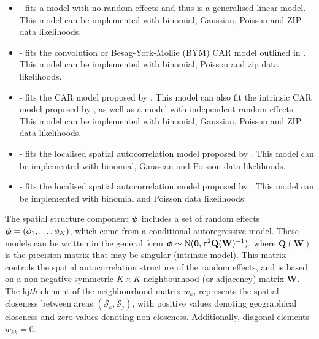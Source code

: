 \documentclass[article,shortnames,nojss]{jss}
\newcommand{\bd}[1]{\ensuremath{\mbox{\boldmath $#1$}}}
\begin{document}
\begin{itemize}
\item {} - fits a model with no random effects and thus is a generalised linear model. This model can be implemented with binomial, Gaussian, Poisson and ZIP data likelihoods.

\item {} - fits the convolution or Besag-York-Mollie (BYM) CAR model outlined in \cite{besag1991}. This model can be implemented with binomial, Poisson and zip data likelihoods.

\item {} - fits the CAR model proposed by \cite{leroux2000}. This model can also fit the intrinsic CAR model proposed by \cite{besag1991}, as well as a model with independent random effects. This model can be implemented with binomial, Gaussian, Poisson and ZIP data likelihoods.

\item {} - fits the localised spatial autocorrelation model proposed by \cite{lee2012}. This model can be implemented with binomial, Gaussian and Poisson data likelihoods.

\item {} - fits the localised spatial autocorrelation model proposed by \cite{lee2015}. This model can be implemented with binomial and Poisson data likelihoods.
\end{itemize}


The spatial structure component $\bd{\psi}$ includes a set of random effects $\bd{\phi}=(\phi_{1},\ldots,\phi_{K})$, which come from a conditional autoregressive model. These models can be written in the general form $\bd{\phi}\sim\mbox{N}(\mathbf{0},\tau^{2}\mathbf{Q}(\mathbf{W})^{-1})$, where $\mathbf{Q}(\mathbf{W})$ is the precision matrix that may be singular (intrinsic model). This matrix controls the spatial autocorrelation structure of the random effects, and is based on a non-negative symmetric $K\times K$ neighbourhood (or adjacency) matrix $\mathbf{W}$. The kj$th$ element of the neighbourhood matrix $w_{kj}$ represents the spatial closeness between areas $(\mathcal{S}_k, \mathcal{S}_j)$, with positive values denoting geographical closeness and zero values denoting non-closeness. Additionally, diagonal elements $w_{kk}=0$.
\end{document}
